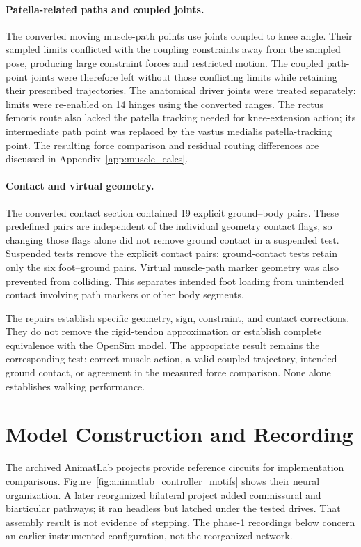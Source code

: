 \paragraph{Patella-related paths and coupled joints.}
The converted moving muscle-path points use joints coupled to knee angle. Their sampled limits conflicted with the coupling constraints away from the sampled pose, producing large constraint forces and restricted motion. The coupled path-point joints were therefore left without those conflicting limits while retaining their prescribed trajectories. The anatomical driver joints were treated separately: limits were re-enabled on 14 hinges using the converted ranges. The rectus femoris route also lacked the patella tracking needed for knee-extension action; its intermediate path point was replaced by the vastus medialis patella-tracking point. The resulting force comparison and residual routing differences are discussed in Appendix~\ref{app:muscle_calcs}.

\paragraph{Contact and virtual geometry.}
The converted contact section contained 19 explicit ground--body pairs. These predefined pairs are independent of the individual geometry contact flags, so changing those flags alone did not remove ground contact in a suspended test. Suspended tests remove the explicit contact pairs; ground-contact tests retain only the six foot--ground pairs. Virtual muscle-path marker geometry was also prevented from colliding. This separates intended foot loading from unintended contact involving path markers or other body segments.

The repairs establish specific geometry, sign, constraint, and contact corrections. They do not remove the rigid-tendon approximation or establish complete equivalence with the OpenSim model. The appropriate result remains the corresponding test: correct muscle action, a valid coupled trajectory, intended ground contact, or agreement in the measured force comparison. None alone establishes walking performance.

\section{Model Construction and Recording}

The archived AnimatLab projects provide reference circuits for implementation comparisons. Figure~\ref{fig:animatlab_controller_motifs} shows their neural organization. A later reorganized bilateral project added commissural and biarticular pathways; it ran headless but latched under the tested drives. That assembly result is not evidence of stepping. The phase-1 recordings below concern an earlier instrumented configuration, not the reorganized network.

